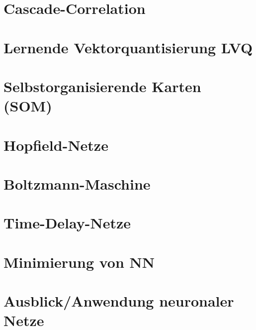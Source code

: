 \documentclass[fleqn,10pt]{SelfArx} %
\begin{document}
\section{Cascade-Correlation}


\section{Lernende Vektorquantisierung LVQ}


\section{Selbstorganisierende Karten (SOM)}


\section{Hopfield-Netze}


\section{Boltzmann-Maschine}


\section{Time-Delay-Netze}


\section{Minimierung von NN}


\section{Ausblick/Anwendung neuronaler Netze}


\end{document}
